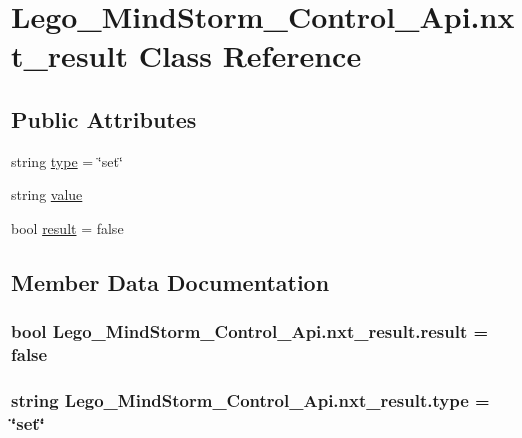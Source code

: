 \hypertarget{class_lego___mind_storm___control___api_1_1nxt__result}{
\section{Lego\_\-MindStorm\_\-Control\_\-Api.nxt\_\-result Class Reference}
\label{class_lego___mind_storm___control___api_1_1nxt__result}
}
\subsection*{Public Attributes}
\begin{CompactItemize}
\item 
string \hyperlink{class_lego___mind_storm___control___api_1_1nxt__result_461016351870c0b5d5ddae997e800946}{type} = \char`\"{}set\char`\"{}
\item 
string \hyperlink{class_lego___mind_storm___control___api_1_1nxt__result_f7cd3aff794205cebd730ef8fa9beb8e}{value}
\item 
bool \hyperlink{class_lego___mind_storm___control___api_1_1nxt__result_1500078368b9a095318ef49eec8020bb}{result} = false
\end{CompactItemize}


\subsection{Member Data Documentation}
\hypertarget{class_lego___mind_storm___control___api_1_1nxt__result_1500078368b9a095318ef49eec8020bb}{
\subsubsection[{result}]{\setlength{\rightskip}{0pt plus 5cm}bool {\bf Lego\_\-MindStorm\_\-Control\_\-Api.nxt\_\-result.result} = false}}
\label{class_lego___mind_storm___control___api_1_1nxt__result_1500078368b9a095318ef49eec8020bb}


\hypertarget{class_lego___mind_storm___control___api_1_1nxt__result_461016351870c0b5d5ddae997e800946}{
\subsubsection[{type}]{\setlength{\rightskip}{0pt plus 5cm}string {\bf Lego\_\-MindStorm\_\-Control\_\-Api.nxt\_\-result.type} = \char`\"{}set\char`\"{}}}
\label{class_lego___mind_storm___control___api_1_1nxt__result_461016351870c0b5d5ddae997e800946}


